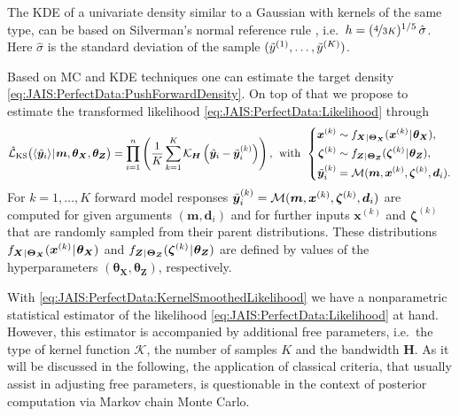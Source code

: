 The KDE of a univariate density similar to a Gaussian with kernels of the same type, can be based on Silverman's normal reference rule \cite{Statistics:Silverman1986}, i.e.\ \(h = (\nicefrac{4}{3K})^{1/5} \, \hat{\sigma}\).
Here \(\hat{\sigma}\) is the standard deviation of the sample \((\tilde{y}^{(1)},\ldots,\tilde{y}^{(K)})\).
\par %
Based on MC and KDE techniques one can estimate the target density \cref{eq:JAIS:PerfectData:PushForwardDensity}.
On top of that we propose to estimate the transformed likelihood \cref{eq:JAIS:PerfectData:Likelihood} through
\begin{equation} \label{eq:JAIS:PerfectData:KernelSmoothedLikelihood}
  \hat{\mathcal{L}}_{\mathrm{KS}} \big( \tuple{\perfect{\bm{y}}_i} \cond \bm{m},\bm{\theta}_{\bm{X}},\bm{\theta}_{\bm{Z}} \big)
  = \prod\limits_{i=1}^n \left( \frac{1}{K} \sum\limits_{k=1}^{K} \mathcal{K}_{\bm{H}} \left( \perfect{\bm{y}}_i-\perfect{\bm{y}}_i^{(k)} \right) \right),
  \;\, \text{with} \;\, \left\{
  \begin{aligned}
    \bm{x}^{(k)}     &\sim f_{\bm{X} \cond \bm{\Theta}_{\bm{X}}}(\bm{x}^{(k)} \cond \bm{\theta}_{\bm{X}}), \\
    \bm{\zeta}^{(k)} &\sim f_{\bm{Z} \cond \bm{\Theta}_{\bm{Z}}}(\bm{\zeta}^{(k)} \cond \bm{\theta}_{\bm{Z}}), \\
    \perfect{\bm{y}}_i^{(k)} &= \mathcal{M}(\bm{m},\bm{x}^{(k)},\bm{\zeta}^{(k)},\bm{d}_i).
  \end{aligned}
  \right.
\end{equation}
For \(k=1,\ldots,K\) forward model responses \(\tilde{\bm{y}}_i^{(k)} = \mathcal{M}(\bm{m},\bm{x}^{(k)},\bm{\zeta}^{(k)},\bm{d}_i)\)
are computed for given arguments \((\bm{m},\bm{d}_i)\) and for further inputs \(\bm{x}^{(k)}\) and \(\bm{\zeta}^{(k)}\) that are randomly sampled from their parent distributions.
These distributions \(f_{\bm{X} {\:\!}|{\:\!} \bm{\Theta}_{\bm{X}}}(\bm{x}^{(k)} {\:\!}|{\:\!} \bm{\theta}_{\bm{X}})\) and \(f_{\bm{Z} {\:\!}|{\:\!} \bm{\Theta}_{\bm{Z}}}(\bm{\zeta}^{(k)} {\:\!}|{\:\!} \bm{\theta}_{\bm{Z}})\)
are defined by values of the hyperparameters \((\bm{\theta}_{\bm{X}},\bm{\theta}_{\bm{Z}})\), respectively.
\par %
With \cref{eq:JAIS:PerfectData:KernelSmoothedLikelihood} we have a nonparametric statistical estimator of the likelihood \cref{eq:JAIS:PerfectData:Likelihood} at hand.
However, this estimator is accompanied by additional free parameters, i.e.\ the type of kernel function \(\mathcal{K}\), the number of samples \(K\) and the bandwidth \(\bm{H}\).
As it will be discussed in the following, the application of classical criteria, that usually assist in adjusting free parameters,
is questionable in the context of posterior computation via Markov chain Monte Carlo.
